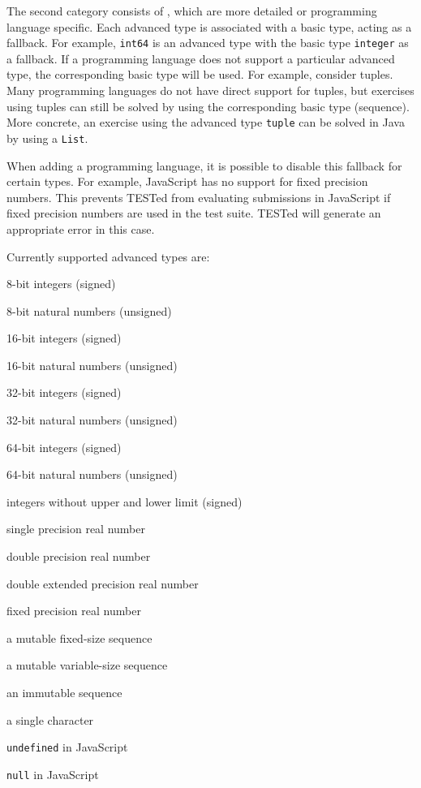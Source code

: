 \documentclass[../main]{subfiles}
\begin{document}
The second category consists of , which are more detailed or programming language specific.
Each advanced type is associated with a basic type, acting as a fallback.
For example, \texttt{int64} is an advanced type with the basic type \texttt{integer} as a fallback.
If a programming language does not support a particular advanced type, the corresponding basic type will be used.
For example, consider tuples.
Many programming languages do not have direct support for tuples, but exercises using tuples can still be solved by using the corresponding basic type (sequence).
More concrete, an exercise using the advanced type \texttt{tuple} can be solved in Java by using a \texttt{List}.

When adding a programming language, it is possible to disable this fallback for certain types.
For example, JavaScript has no support for fixed precision numbers.
This prevents TESTed from evaluating submissions in JavaScript if fixed precision numbers are used in the test suite.
TESTed will generate an appropriate error in this case.

Currently supported advanced types are:

\begin{description}[noitemsep]
    \item[\texttt{int8}] 8-bit integers (signed)
    \item[\texttt{uint8}] 8-bit natural numbers (unsigned)
    \item[\texttt{int16}] 16-bit integers (signed)
    \item[\texttt{uint16}] 16-bit natural numbers (unsigned)
    \item[\texttt{int32}] 32-bit integers (signed)
    \item[\texttt{uint32}] 32-bit natural numbers (unsigned)
    \item[\texttt{int64}] 64-bit integers (signed)
    \item[\texttt{uint64}] 64-bit natural numbers (unsigned)
    \item[\texttt{bigint}] integers without upper and lower limit (signed)
    \item[\texttt{single\_precision}] single precision real number
    \item[\texttt{double\_precision}] double precision real number
    \item[\texttt{double\_extended}] double extended precision real number
    \item[\texttt{fixed\_precision}] fixed precision real number
    \item[\texttt{array}] a mutable fixed-size sequence
    \item[\texttt{list}] a mutable variable-size sequence
    \item[\texttt{tuple}] an immutable sequence
    \item[\texttt{char}] a single character
    \item[\texttt{undefined}] \texttt{undefined} in JavaScript
    \item[\texttt{null}] \texttt{null} in JavaScript
\end{description}
\end{document}
